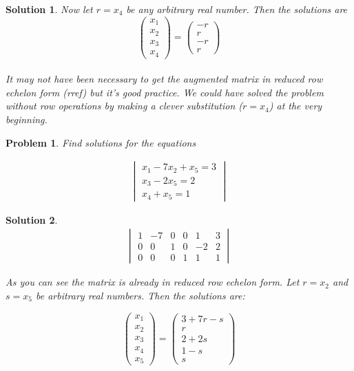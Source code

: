 \documentclass{article}
\newtheorem{problem}{Problem}
\newtheorem*{solution}{Solution}
\begin{document}
\begin{solution}
Now let $r = x_{4}$ be any arbitrary real number. Then the solutions are \\

\begin{equation*}
\begin{pmatrix}
x_{1} \\ x_{2} \\ x_{3} \\ x_{4}
\end{pmatrix}
=
\begin{pmatrix}
-r \\ r \\ -r \\ r
\end{pmatrix}
\end{equation*} \\

It may not have been necessary to get the augmented matrix in reduced row echelon form (rref) but it's good practice. We could have solved the problem without row operations by making a clever substitution ($r = x_{4}$) at the very beginning.

\end{solution}

\begin{problem} 
Find solutions for the equations

\begin{align*}
\begin{vmatrix}
x_{1} - 7x_{2} + x_{5} = 3 \\
x_{3} - 2x_{5} = 2 \\
x_{4} + x_{5} = 1
\end{vmatrix}
\end{align*}
\end{problem}

\begin{solution}

\begin{align*}
\begin{vmatrix}
1 & -7 & 0 & 0 & 1 & 3 \\
0 & 0 & 1 & 0 & -2 & 2 \\
0 & 0 & 0 & 1 & 1 & 1
\end{vmatrix}
\end{align*}

As you can see the matrix is already in reduced row echelon form. Let $r = x_{2}$ and $s = x_{5}$ be arbitrary real numbers. Then the solutions are:

\begin{equation*}
\begin{pmatrix}
x_{1} \\ x_{2} \\ x_{3} \\ x_{4} \\ x_{5} 
\end{pmatrix}
=
\begin{pmatrix}
3 + 7r - s \\
r \\
2 + 2s \\
1 - s \\
s
\end{pmatrix}
\end{equation*}

\end{solution}
\end{document}
